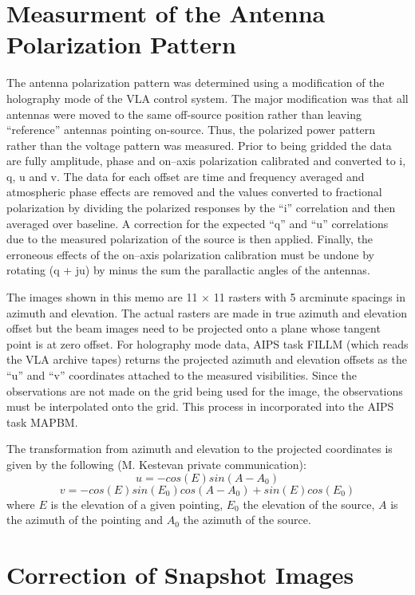 \section {Measurment of the Antenna Polarization Pattern}

   The antenna polarization pattern was determined using a
modification of the holography mode of the VLA control system.  The
major modification was that all antennas were moved to the same
off-source position rather than leaving ``reference'' antennas
pointing on-source.
Thus, the polarized power pattern rather than the voltage pattern was
measured.
Prior to being gridded the data are fully amplitude, phase and
on--axis polarization calibrated and converted to i, q, u and v.
The data for each offset are time and frequency averaged and
atmospheric phase effects are removed and the values converted to
fractional polarization by dividing the polarized responses by the
``i'' correlation and then averaged over baseline.
A correction for the expected ``q'' and ``u'' correlations due to
the measured polarization of the source is then applied.
Finally, the erroneous effects of the on--axis polarization
calibration must be undone by rotating (q + ju) by minus the sum the
parallactic angles of the antennas.

The images shown in this memo are 11 $\times$ 11 rasters with 5
arcminute spacings in azimuth and elevation.
The actual rasters are made in true azimuth and elevation offset but
the beam images need to be projected onto a plane whose tangent point is
at zero offset.
For holography mode data, AIPS task FILLM (which reads the VLA archive
tapes) returns the projected azimuth and elevation offsets as the ``u''
and ``v'' coordinates attached to the measured visibilities.
Since the observations are not made on the grid being used for the image,
the observations must be interpolated onto the grid.
This process in incorporated into the AIPS task MAPBM.

   The transformation from azimuth and elevation to the projected
coordinates is given by the following (M. Kestevan private
communication):
$$ u = -cos(E)sin(A-A_0) $$
$$ v = -cos(E)sin(E_0)cos(A-A_0)+sin(E)cos(E_0) $$
where $E$ is the elevation of a given pointing, $E_0$ the elevation of
the source, $A$ is the azimuth of the pointing and $A_0$ the azimuth
of the source.

\section {Correction of Snapshot Images}

